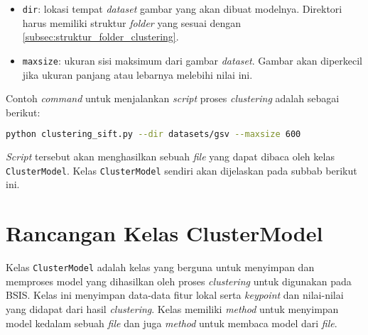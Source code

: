 \begin{itemize}
	\item \texttt{dir}: lokasi tempat \textit{dataset} gambar yang akan dibuat modelnya. Direktori harus memiliki struktur \textit{folder} yang sesuai dengan \ref{subsec:struktur_folder_clustering}.
	\item \texttt{maxsize}: ukuran sisi maksimum dari gambar \textit{dataset}. Gambar akan diperkecil jika ukuran panjang atau lebarnya melebihi nilai ini.
\end{itemize}
Contoh \textit{command} untuk menjalankan \textit{script} proses \textit{clustering} adalah sebagai berikut:
\begin{lstlisting}[language=bash, 
	basicstyle=\normalsize,
	frame=none,
	numbers=none]
	python clustering_sift.py --dir datasets/gsv --maxsize 600
\end{lstlisting}

\textit{Script} tersebut akan menghasilkan sebuah \textit{file} yang dapat dibaca oleh kelas \texttt{ClusterModel}. Kelas \texttt{ClusterModel} sendiri akan dijelaskan pada subbab berikut ini.
 
\section{Rancangan Kelas ClusterModel}
\label{sec:clustermodel_class}
Kelas \texttt{ClusterModel} adalah kelas yang berguna untuk menyimpan dan memproses model yang dihasilkan oleh proses \textit{clustering} untuk digunakan pada BSIS. Kelas ini menyimpan data-data fitur lokal serta \textit{keypoint} dan nilai-nilai yang didapat dari hasil \textit{clustering}. Kelas memiliki \textit{method} untuk menyimpan model kedalam sebuah \textit{file} dan juga \textit{method} untuk membaca model dari \textit{file}. 

